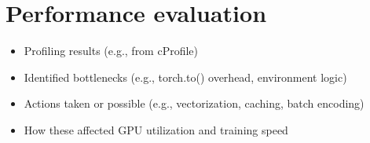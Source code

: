\section{Performance evaluation}
\label{sec:performance-evaluation}


\begin{itemize}
    \item Profiling results (e.g., from cProfile)
    \item Identified bottlenecks (e.g., torch.to() overhead, environment logic)
    \item Actions taken or possible (e.g., vectorization, caching, batch encoding)
    \item How these affected GPU utilization and training speed
\end{itemize}
